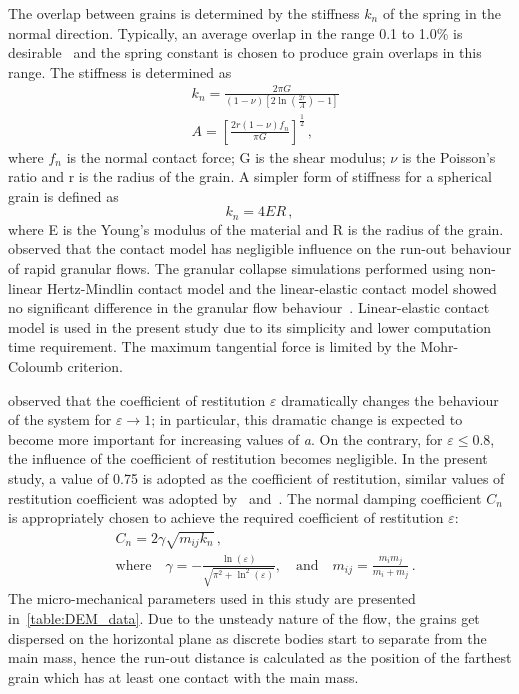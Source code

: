 The overlap between grains is determined by the stiffness 
$\textit{k}_{\textit{n}}$ of the spring in the normal direction. Typically, 
an average overlap in the range 0.1 to 1.0\% is desirable~\citep{Zenit2005} and 
the spring constant is chosen to produce grain overlaps in this range. The 
stiffness is determined as
\begin{align}
& \textit{k}_{\textit{n}}=\frac{2 \pi 
G}{(1-\nu)\left[2\ln(\frac{2r}{A})-1\right]} \\ 
& A = \left[\frac{2r(1-\nu)f_{n}}{\pi G}\right]^{\frac{1	}{2}}\,,
\end{align}
where $f_{n}$ is the normal contact force; G is the shear modulus; $\nu$ is the 
Poisson's ratio and r is the radius of the grain. A simpler form of stiffness 
for a spherical grain is defined as
\begin{equation}
\textit{k}_{\textit{n}}=4ER\,,
\end{equation}
where E is the Young's modulus of the material and R is the radius of the 
grain.~\citet{Cambou2009} observed that the contact model has negligible 
influence on the run-out behaviour of rapid granular flows. The granular 
collapse simulations performed using non-linear Hertz-Mindlin contact model and 
the linear-elastic contact model showed no significant difference in the 
granular flow behaviour~\citep{Utili2014}. Linear-elastic contact model is used 
in the present study due to its simplicity and lower computation time 
requirement. The maximum tangential force is limited by the Mohr-Coloumb 
criterion. 


\citet{Staron2007a} observed that the coefficient of restitution $\varepsilon$ 
dramatically changes the behaviour of the system for 
$\varepsilon\rightarrow 1$; in particular, this dramatic change is expected 
to become more important for increasing values of \textit{a}. On the contrary, 
for $\varepsilon \le 0.8$, the influence of the coefficient of restitution 
becomes 
negligible. In the present study, a value of 0.75 is adopted as the coefficient 
of restitution, similar values of restitution coefficient was adopted 
by~\citet{Girolami} and~\citet{Zenit2005}. The normal damping coefficient 
$C_{\textit{n}}$ 
is appropriately chosen to achieve the required coefficient of restitution 
$\varepsilon$:
\begin{align}
& C_{\textit{n}}=2\gamma \sqrt{m_{\textit{ij}}k_{\textit{n}}} \,,\\ 
& \mbox{where} \quad \gamma = -\frac{\ln(\varepsilon)}{\sqrt{\pi^{2}+\ln^2 
(\varepsilon)}},\quad \mbox{and} \quad 
\textit{m}_{\textit{ij}}=\frac{\textit{m}_{\textit{i}}\textit{m}_{\textit{j}}}{\textit{m}_{\textit{i}}
 + \textit{m}_{\textit{j}}} \,.
\end{align}
%
The micro-mechanical parameters used in this study are presented 
in~\cref{table:DEM_data}. Due to the unsteady nature of the flow, the 
grains get dispersed on the horizontal plane as discrete bodies start to 
separate from the main mass, hence the run-out distance is calculated as the 
position of the farthest grain which has at least one contact with the main 
mass.

